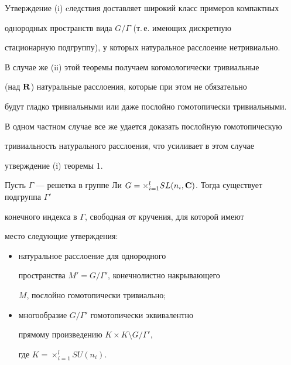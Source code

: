 Утверждение (i) cледствия доставляет широкий класс примеров компактных


однородных пространств вида $G/ \Gamma$ (т.\,е. имеющих дискретную


стационарную подгруппу), у которых натуральное расслоение нетривиально.


В случае же (ii) этой теоремы получаем когомологически тривиальные


(над $\bold R$) натуральные расслоения, которые при этом не обязательно


будут гладко тривиальными или даже послойно гомотопически тривиальными.


В одном частном случае все же удается доказать послойную гомотопическую


тривиальность натурального расслоения, что усиливает в этом случае


утверждение (i) теоремы 1.





\begin{thm}


Пусть $\Gamma$ --- решетка в группе Ли $G =


\times _{i=1}^l SL(n_i,\bold C)$. Тогда существует подгруппа $\Gamma '$


конечного индекса в $\Gamma$, свободная от кручения, для которой имеют


место следующие утверждения$:$


\begin{itemize}


\item[(i)] натуральное расслоение для однородного


пространства $M' = G/{\Gamma'}$, конечнолистно накрывающего


$M$, послойно гомотопически тривиально$;$


\item[(ii)] многообразие $G/\Gamma'$ гомотопически эквивалентно


прямому произведению $K \times K \setminus G/{\Gamma'}$,


где $K=\times_{i=1}^l SU(n_i)$.


\end{itemize}


\end{thm}





